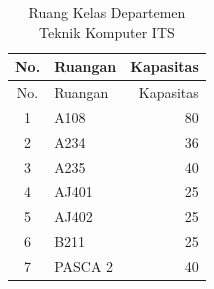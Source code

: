 \begin{longtable}{|c|l|r|}
  \caption{Ruang Kelas Departemen Teknik Komputer ITS}
  \label{tb:ruang}\\
  \hline
  \rowcolor[HTML]{D0CECE} 
  No. & Ruangan & Kapasitas \\ \hline
  \endfirsthead
  \hline
  \rowcolor[HTML]{D0CECE} 
  No. & Ruangan & Kapasitas \\ \hline
  \endhead
  1   & A108                                                 & 80                                                     \\ 
  2   & A234                                                 & 36                                                     \\ 
  3   & A235                                                 & 40                                                     \\ 
  4   & AJ401                                                & 25                                                     \\ 
  5   & AJ402                                                & 25                                                     \\ 
  6   & B211                                                 & 25                                                     \\ 
  7   & PASCA 2                                              & 40                                                     \\ 
  \hline
\end{longtable}

